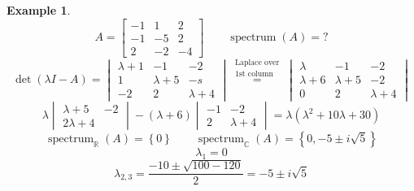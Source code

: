 \documentclass[a4paper,landscape,twocolumn]{article}
\newcommand\set[1]{\left\{#1\right\}}
\theoremstyle{definition}
\newtheorem{ex}{Example}
\DeclareMathOperator\spec{spectrum}
\begin{document}
\begin{ex}
  \[
    A = \begin{bmatrix}
      -1 & 1 & 2 \\
      -1 & -5 & 2 \\
      2 & -2 & -4
    \end{bmatrix}
    \qquad
    \spec(A) = ?
  \] \[
    \det(\lambda I - A) = \begin{vmatrix}
      \lambda + 1 & -1 & -2 \\
      1 & \lambda + 5 & -s \\
      -2 & 2 & \lambda + 4
    \end{vmatrix}
    \overset{\substack{\text{Laplace over} \\ \text{1st column}}}{=}
    \begin{vmatrix}
      \lambda & -1 & -2 \\
      \lambda + 6 & \lambda + 5 & -2 \\
      0 & 2 & \lambda + 4
    \end{vmatrix}
  \] \[
    \lambda \begin{vmatrix} \lambda + 5 & -2 \\ 2 \lambda + 4 \end{vmatrix}
    - (\lambda + 6) \begin{vmatrix} -1 & -2 \\ 2 & \lambda + 4 \end{vmatrix}
    = \lambda (\lambda^2 + 10 \lambda + 30)
  \] \[
    \spec_{\mathbb R}(A) = \set{0} \qquad \spec_{\mathbb C}(A) = \set{0, -5 \pm i \sqrt{5}}
  \] \[
    \lambda_1 = 0
  \] \[
    \lambda_{2,3} = \frac{-10 \pm \sqrt{100 - 120}}{2} = -5 \pm i \sqrt{5}
  \]
\end{ex}
\end{document}

